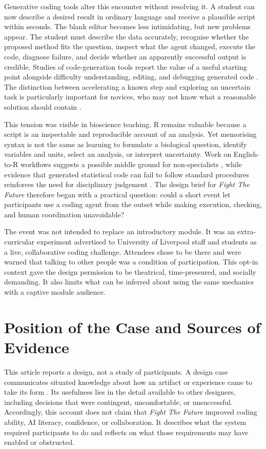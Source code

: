 \documentclass[11pt,a4paper]{article}
\begin{document}
Generative coding tools alter this encounter without resolving it. A student can now describe a desired result in ordinary language and receive a plausible script within seconds. The blank editor becomes less intimidating, but new problems appear. The student must describe the data accurately, recognise whether the proposed method fits the question, inspect what the agent changed, execute the code, diagnose failure, and decide whether an apparently successful output is credible. Studies of code-generation tools report the value of a useful starting point alongside difficulty understanding, editing, and debugging generated code \citep{vaithilingam2022expectation}. The distinction between accelerating a known step and exploring an uncertain task is particularly important for novices, who may not know what a reasonable solution should contain \citep{barke2023grounded}.

This tension was visible in bioscience teaching. R remains valuable because a script is an inspectable and reproducible account of an analysis. Yet memorising syntax is not the same as learning to formulate a biological question, identify variables and units, select an analysis, or interpret uncertainty. Work on English-to-R workflows suggests a possible middle ground for non-specialists \citep{bien2025generative}, while evidence that generated statistical code can fail to follow standard procedures reinforces the need for disciplinary judgement \citep{schwarz2025generative}. The design brief for \emph{Fight The Future} therefore began with a practical question: could a short event let participants use a coding agent from the outset while making execution, checking, and human coordination unavoidable?

The event was not intended to replace an introductory module. It was an extra-curricular experiment advertised to University of Liverpool staff and students as a live, collaborative coding challenge. Attendees chose to be there and were warned that talking to other people was a condition of participation. This opt-in context gave the design permission to be theatrical, time-pressured, and socially demanding. It also limits what can be inferred about using the same mechanics with a captive module audience.

\section{Position of the Case and Sources of Evidence}

This article reports a design, not a study of participants. A design case communicates situated knowledge about how an artifact or experience came to take its form \citep{boling2010need}. Its usefulness lies in the detail available to other designers, including decisions that were contingent, uncomfortable, or unsuccessful. Accordingly, this account does not claim that \emph{Fight The Future} improved coding ability, AI literacy, confidence, or collaboration. It describes what the system required participants to do and reflects on what those requirements may have enabled or obstructed.
\end{document}
